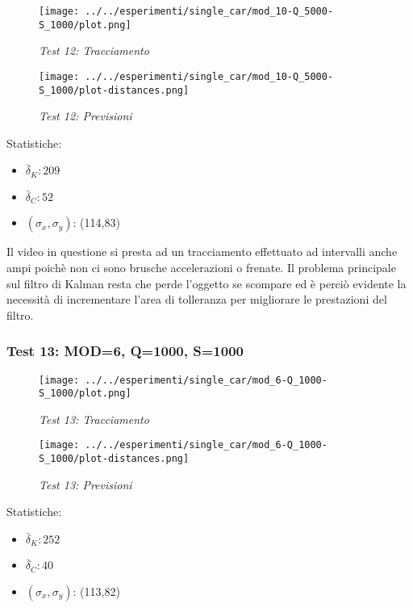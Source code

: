 \begin{figure}[hb]
\centering
\texttt{[image: ../../esperimenti/single\_car/mod\_10-Q\_5000-S\_1000/plot.png]}
\caption{\textit{Test 12: Tracciamento}}
\end{figure}

\begin{figure}[hb]
\centering
\texttt{[image: ../../esperimenti/single\_car/mod\_10-Q\_5000-S\_1000/plot-distances.png]}
\caption{\textit{Test 12: Previsioni}}
\end{figure}

Statistiche:
\begin{itemize}
\item \begin{math} \bar \delta_K:  209 \end{math}
\item \begin{math} \bar \delta_C:  52 \end{math}
\item \begin{math}(\sigma_x,\sigma_y)\end{math}: (114,83)
\end{itemize}

Il video in questione si presta ad un tracciamento effettuato ad intervalli anche ampi poichè non ci sono brusche accelerazioni o frenate. Il problema principale sul filtro di Kalman resta che perde l'oggetto se scompare ed è perciò evidente la necessità di incrementare l'area di tolleranza per migliorare le prestazioni del filtro. 

\newpage
\subsubsection{Test 13: MOD=6, Q=1000, S=1000}

\begin{figure}[hb]
\centering
\texttt{[image: ../../esperimenti/single\_car/mod\_6-Q\_1000-S\_1000/plot.png]}
\caption{\textit{Test 13: Tracciamento}}
\end{figure}

\begin{figure}[hb]
\centering
\texttt{[image: ../../esperimenti/single\_car/mod\_6-Q\_1000-S\_1000/plot-distances.png]}
\caption{\textit{Test 13: Previsioni}}
\end{figure}

Statistiche:
\begin{itemize}
\item \begin{math} \bar \delta_K: 252 \end{math}
\item \begin{math} \bar \delta_C: 40 \end{math}
\item \begin{math}(\sigma_x,\sigma_y)\end{math}: (113,82)
\end{itemize}

